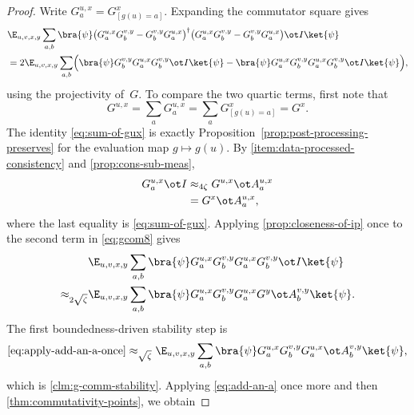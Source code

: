 \begin{proof}
	\leanok
	Write $G_a^{u,x}=G^x_{[g(u)=a]}$. Expanding the commutator square gives
	\begin{align}
		 & \E_{u,v,x,y} \sum_{a,b} \bra{\psi}
		\bigl(G_a^{u,x} G_b^{v,y} - G_b^{v,y} G_a^{u,x}\bigr)^\dagger
		\bigl(G_a^{u,x} G_b^{v,y} - G_b^{v,y} G_a^{u,x}\bigr)
		\ot I \ket{\psi}\nonumber             \\
		 & = 2 \E_{u,v,x,y} \sum_{a,b}
		\Bigl(\bra{\psi} G_b^{v,y} G_a^{u,x} G_b^{v,y} \ot I \ket{\psi}
		- \bra{\psi} G_a^{u,x} G_b^{v,y} G_a^{u,x} G_b^{v,y} \ot I \ket{\psi}\Bigr),
		\label{eq:gcom8}
	\end{align}
	using the projectivity of~$G$. To compare the two quartic terms, first note that
	\begin{equation}\label{eq:sum-of-gux}
		G^{u,x} = \sum_a G_a^{u,x} = \sum_a G^x_{[g(u)=a]} = G^x.
	\end{equation}
	The identity \eqref{eq:sum-of-gux} is exactly Proposition~\ref{prop:post-processing-preserves} for the evaluation map $g \mapsto g(u)$.
	By \ref{item:data-processed-consistency} and \ref{prop:cons-sub-meas},
	\begin{align}
		G_a^{u,x} \ot I
		 & \approx_{4\zeta} G^{u,x} \ot A_a^{u,x}\nonumber \\
		 & = G^x \ot A_a^{u,x}, \label{eq:add-an-a}
	\end{align}
	where the last equality is \ref{eq:sum-of-gux}. Applying \ref{prop:closeness-of-ip} once to the second term in \ref{eq:gcom8} gives
	\begin{align}
		                        & \E_{u,v,x,y} \sum_{a,b}
		\bra{\psi} G_a^{u,x} G_b^{v,y} G_a^{u,x} G_b^{v,y} \ot I \ket{\psi}\nonumber \\
		\approx_{2\sqrt{\zeta}} &
		\E_{u,v,x,y} \sum_{a,b}
		\bra{\psi} G_a^{u,x} G_b^{v,y} G_a^{u,x} G^y \ot A_b^{v,y} \ket{\psi}.
		\label{eq:apply-add-an-a-once}
	\end{align}
	The first boundedness-driven stability step is
	\begin{equation}
		\eqref{eq:apply-add-an-a-once}
		\approx_{\sqrt{\zeta}}
		\E_{u,v,x,y} \sum_{a,b}
		\bra{\psi} G_a^{u,x} G_b^{v,y} G_a^{u,x} \ot A_b^{v,y} \ket{\psi},
		\label{eq:gcom9}
	\end{equation}
	which is \ref{clm:g-comm-stability}. Applying \ref{eq:add-an-a} once more and then \ref{thm:commutativity-points}, we obtain

\end{proof}

